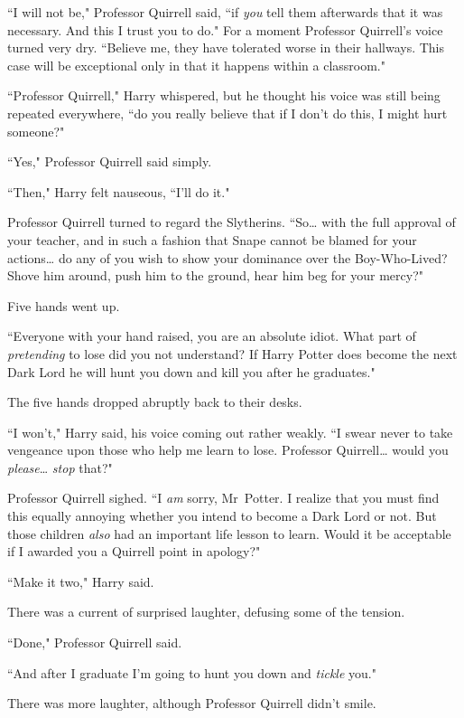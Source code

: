 ``I will not be," Professor Quirrell said, ``if \emph{you} tell them afterwards that it was necessary. And this I trust you to do." For a moment Professor Quirrell's voice turned very dry. ``Believe me, they have tolerated worse in their hallways. This case will be exceptional only in that it happens within a classroom."

``Professor Quirrell," Harry whispered, but he thought his voice was still being repeated everywhere, ``do you really believe that if I don't do this, I might hurt someone?"

``Yes," Professor Quirrell said simply.

``Then," Harry felt nauseous, ``I'll do it."

Professor Quirrell turned to regard the Slytherins. ``So{\ldots} with the full approval of your teacher, and in such a fashion that Snape cannot be blamed for your actions{\ldots} do any of you wish to show your dominance over the Boy-Who-Lived? Shove him around, push him to the ground, hear him beg for your mercy?"

Five hands went up.

``Everyone with your hand raised, you are an absolute idiot. What part of \emph{pretending} to lose did you not understand? If Harry Potter does become the next Dark Lord he will hunt you down and kill you after he graduates."

The five hands dropped abruptly back to their desks.

``I won't," Harry said, his voice coming out rather weakly. ``I swear never to take vengeance upon those who help me learn to lose. Professor Quirrell{\ldots} would you \emph{please}{\ldots} \emph{stop} that?"

Professor Quirrell sighed. ``I \emph{am} sorry, Mr~Potter. I realize that you must find this equally annoying whether you intend to become a Dark Lord or not. But those children \emph{also} had an important life lesson to learn. Would it be acceptable if I awarded you a Quirrell point in apology?"

``Make it two," Harry said.

There was a current of surprised laughter, defusing some of the tension.

``Done," Professor Quirrell said.

``And after I graduate I'm going to hunt you down and \emph{tickle} you."

There was more laughter, although Professor Quirrell didn't smile.

